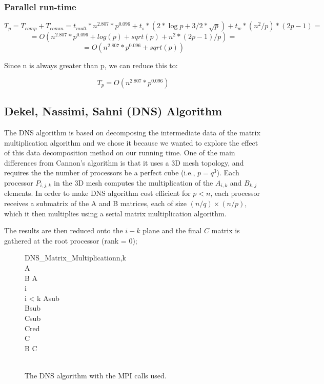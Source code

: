 \documentclass{article}
\begin{document}
\subsubsection{Parallel run-time}

$$T_p = T_{{comp}} + T_{{comm}} = t_{{mult}} * n^2.807 * p^0.096 + t_s*(2*\log{p} + 3/2*\sqrt{p}) + t_w*(n^2/p)*(2p-1) =$$
$$	= O(n^2.807 * p^0.096 + log(p) + sqrt(p) + n^2*(2p-1)/p) =$$
$$	= O(n^2.807 * p^0.096 + sqrt(p))$$

Since n is always greater than p, we can reduce this to:

$$	T_p = O(n^{2.807} * p^{0.096})$$




\subsection{Dekel, Nassimi, Sahni (DNS) Algorithm}

The DNS algorithm is based on decomposing the intermediate data of the matrix
multiplication algorithm and we chose it because we wanted to explore the effect
of this data decomposition method on our running time. One of the main
differences from Cannon's algorithm is that it uses a 3D mesh topology, and
requires the the number of processors be a perfect cube (i.e., $p = q^3$). Each
processor $P_{i,j,k}$ in the 3D mesh computes the multiplication of the
$A_{i,k}$ and $B_{k,j}$ elements.  In order to make DNS algorithm cost efficient
for $p < n$, each processor receives a submatrix of the A and B matrices, each
of size $(n/q) \times (n/p)$, which it then multiplies using a serial matrix
multiplication algorithm.

The results are then reduced onto the $i-k$ plane and the final $C$ matrix is
gathered at the root processor (rank = 0);

\begin{figure}

\begin{pseudocode}[ruled]{DNS\_Matrix\_Multiplication}{n,k}
 \\
A \GETS {} \\
B \GETS A \\
i  \\

\WHILE i < k \DO
\BEGIN
	Asub \GETS {} \\
	Bsub \GETS {} \\
	Csub \GETS {} \\
	
	Cred \GETS {} \\
	C \GETS {} \\

	B \GETS C \\
\END \vspace{10pt} \\

\end{pseudocode}
\caption{The DNS algorithm with the MPI calls used.}
\end{figure}
\end{document}
